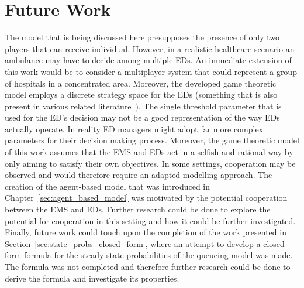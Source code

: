 \section{Future Work}


The model that is being discussed here presupposes the presence of only two
players that can receive individual.
However, in a realistic healthcare scenario an ambulance may have to decide
among multiple EDs.
An immediate extension of this work would be to consider a multiplayer system
that could represent a group of hospitals in a concentrated area.
Moreover, the developed game theoretic model employs a discrete strategy space
for the EDs (something that is also present in various related
literature~\cite{deo2011centralized,knight_measuring_poa}).
The single threshold parameter that is used for the ED's decision may not be
a good representation of the way EDs actually operate.
In reality ED managers might adopt far more complex parameters for their
decision making process.
Moreover, the game theoretic model of this work assumes that the EMS and EDs
act in a selfish and rational way by only aiming to satisfy their own
objectives.
In some settings, cooperation may be observed and would therefore require
an adapted modelling approach.
The creation of the agent-based model that was introduced in
Chapter~\ref{sec:agent_based_model} was motivated by the potential cooperation
between the EMS and EDs.
Further research could be done to explore the potential for cooperation in
this setting and how it could be further investigated.
Finally, future work could touch upon the completion of the work presented in
Section~\ref{sec:state_probs_closed_form}, where an attempt to develop a closed
form formula for the steady state probabilities of the queueing model was
made.
The formula was not completed and therefore further research could be done to
derive the formula and investigate its properties.
